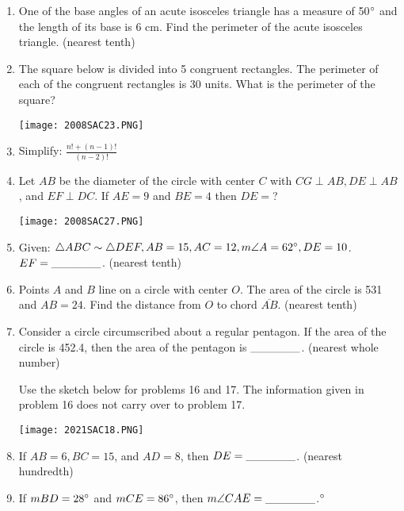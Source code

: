 \documentclass[../uilmath.tex]{subfiles}
\begin{document}
\begin{enumerate}[label=\bfseries\arabic*.]
    \item %
    One of the base angles of an acute isosceles triangle has a measure of 50$\degree$ and the length of its base is 6 cm. Find the perimeter of the acute isosceles triangle. (nearest tenth)

    \item %
    The square below is divided into 5 congruent rectangles. The perimeter of each of the congruent rectangles is 30 units. What is the perimeter of the square?
    \begin{center}
        \texttt{[image: 2008SAC23.PNG]}
    \end{center}

    \item %
    Simplify: $\frac{n!+(n-1)!}{(n-2)!}$

    \item %
    Let $AB$ be the diameter of the circle with center $C$ with $CG\perp AB, DE\perp AB$, and $EF\perp DC$. 
    If $AE=9$ and $BE=4$ then $DE=$?
    \begin{center}
        \texttt{[image: 2008SAC27.PNG]}
    \end{center}

    \item %
    Given: $\triangle ABC \sim \triangle DEF, AB = 15, AC = 12, m\angle A = 62\degree, DE = 10$. $EF=\_\_\_\_\_\_$. (nearest tenth)

    \item %
    Points $A$ and $B$ line on a circle with center $O$. The area of the circle is 531 and $AB=24$. Find the distance from $O$ to chord $\overline{AB}$. (nearest tenth)

    \item %
    Consider a circle circumscribed about a regular pentagon. If the area of the circle is 452.4, then the area of the pentagon is $\_\_\_\_\_\_$. (nearest whole number)


    Use the sketch below for problems 16 and 17. The information given in problem 16 does not carry over to problem 17.
    \begin{center}
        \texttt{[image: 2021SAC18.PNG]}
    \end{center}
    \item %
    If $AB=6, BC=15$, and $AD=8$, then $DE=\_\_\_\_\_\_$. (nearest hundredth)

    \item %
    If $mBD = 28\degree$ and $mCE = 86\degree$, then $m\angle CAE=\_\_\_\_\_\_$.$\degree$


\end{enumerate}
\end{document}
